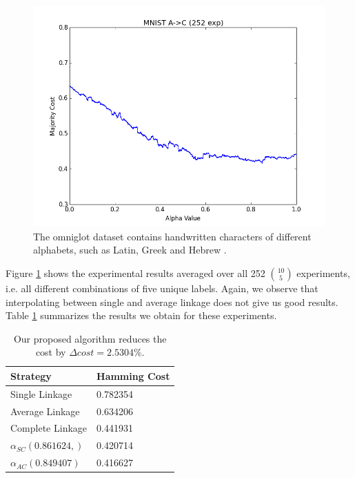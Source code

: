 \begin{figure}[h]
\begin{minipage}{.3\textwidth}
  \includegraphics[width=\linewidth]{images/MNIST_AC_250}
\end{minipage}
\caption{The omniglot dataset contains handwritten characters of different alphabets, such as Latin, Greek and Hebrew \cite{Lake1332}.}
\label{fig:mnist250}
\end{figure}

Figure \ref{fig:mnist250} shows the experimental results averaged over all 252 $10 \choose 5$ experiments, i.e. all different combinations of five unique labels. Again, we observe that interpolating between single and average linkage does not give us good results. Table \ref{table:mnist250results} summarizes the results we obtain for these experiments.

\begin{table}[h]
    \centering
    \begin{tabular}{|l | l|}
    \hline
    Strategy & Hamming Cost\\ \hline
    Single Linkage & 0.782354\\
    Average Linkage & 0.634206\\
    Complete Linkage & 0.441931\\
    $\alpha_{SC}(0.861624,)$ & 0.420714\\
    $\alpha_{AC}(0.849407)$ & 0.416627\\\hline
    \end{tabular}
    \caption{Our proposed algorithm reduces the cost by $\Delta cost = 2.5304\%$.}
    \label{table:mnist250results}
\end{table}

